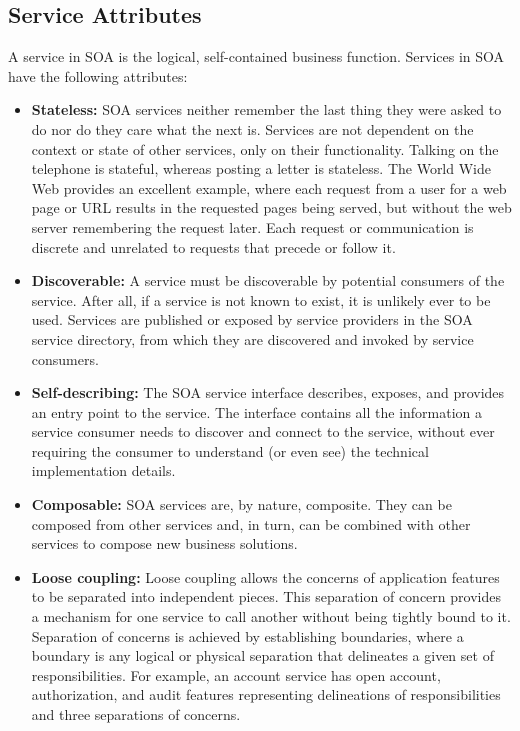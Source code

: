 \documentclass[12pt,a4paper,final,twoside,onecolumn,titlepage]{book}
\begin{document}
\subsection{Service Attributes}
A service in \gls{SOA} is the logical, self-contained business function. Services in \gls{SOA} have the following attributes:
\begin{itemize}
\item \textbf{Stateless:} \gls{SOA} services neither remember the last thing they were asked to do nor do they care what the next is. Services are not dependent on the context or state of other services, only on their functionality. Talking on the telephone is stateful, whereas posting a letter is stateless. The World Wide Web provides an excellent example, where each request from a user for a web page or URL results in the requested pages being served, but without the web server remembering the request later. Each request or communication is discrete and unrelated to requests that precede or follow it.
\item \textbf{Discoverable:} A service must be discoverable by potential consumers of the service. After all, if a service is not known to exist, it is unlikely ever to be used. Services are published or exposed by service providers in the \gls{SOA} service directory, from which they are discovered and invoked by service consumers.
\item \textbf{Self-describing:} The \gls{SOA} service interface describes, exposes, and provides an entry point to the service. The interface contains all the information a service consumer needs to discover and connect to the service, without ever requiring the consumer to understand (or even see) the technical implementation details.
\item \textbf{Composable:} \gls{SOA} services are, by nature, composite. They can be composed from other services and, in turn, can be combined with other services to compose new business solutions.
\item \textbf{Loose coupling:} Loose coupling allows the concerns of application features to be separated into independent pieces. This separation of concern provides a mechanism for one service to call another without being tightly bound to it. Separation of concerns is achieved by establishing boundaries, where a boundary is any logical or physical separation that delineates a given set of responsibilities. For example, an account service has open account, authorization, and audit features representing delineations of responsibilities and three separations of concerns.

\end{itemize}
\end{document}
